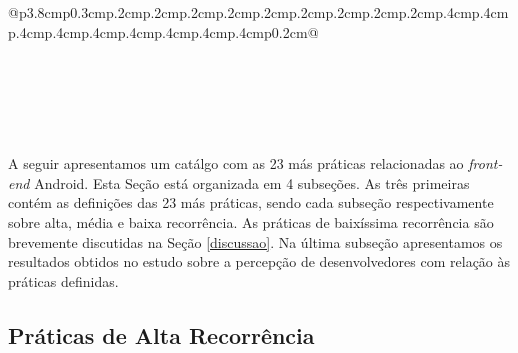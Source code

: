 \begin{table*}[t]
\begin{tabular}{@{}p{3.8cm}p{0.3cm}p{.2cm}p{.2cm}p{.2cm}p{.2cm}p{.2cm}p{.2cm}p{.2cm}p{.2cm}p{.2cm}p{.4cm}p{.4cm}p{.4cm}p{.4cm}p{.4cm}p{.4cm}p{.4cm}p{.4cm}p{.4cm}p{0.2cm}@{}}
 \\
 \\
 \\
 \\
 \\
 \\
\toprule
\end{tabular}
\caption{Lista de práticas de alta, média e baixa recorrência.}
\label{tab:Categories}
\end{table*}

A seguir apresentamos um catálgo com as 23 más práticas relacionadas ao \textit{front-end} Android. Esta Seção está organizada em 4 subseções. As três primeiras contém as definições das 23 más práticas, sendo cada subseção respectivamente sobre alta, média e baixa recorrência. As práticas de baixíssima recorrência são brevemente discutidas na Seção \ref{discussao}. Na última subseção apresentamos os resultados obtidos no estudo sobre a percepção de desenvolvedores com relação às práticas definidas.


\subsection{Práticas de Alta Recorrência}

